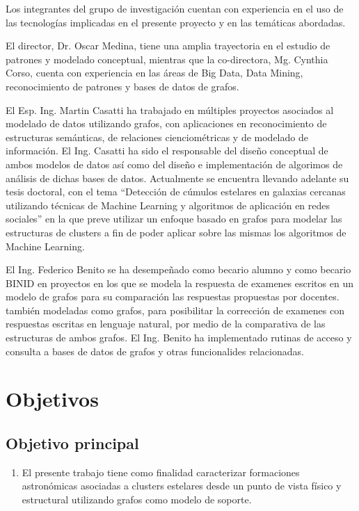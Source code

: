\documentclass[
	11pt,oneside,a4paper,
	fleqn,
	article
]{memoir}
\begin{document}
Los integrantes del grupo de investigación cuentan con experiencia en el uso de las tecnologías implicadas en el presente proyecto y en las temáticas abordadas.

El director, Dr. Oscar Medina, tiene una amplia trayectoria en el estudio de patrones y modelado conceptual, mientras que la co-directora, Mg. Cynthia Corso, cuenta con experiencia en las áreas de Big Data, Data Mining, reconocimiento de patrones y bases de datos de grafos.

El Esp. Ing. Martin Casatti ha trabajado en múltiples proyectos asociados al modelado de datos utilizando grafos, con aplicaciones en reconocimiento de estructuras semánticas, de relaciones cienciométricas y de modelado de información. El Ing. Casatti ha sido el responsable del diseño conceptual de ambos modelos de datos así como del diseño e implementación de algorimos de análisis de dichas bases de datos. Actualmente se encuentra llevando adelante su tesis doctoral, con el tema ``Detección de cúmulos estelares en galaxias cercanas utilizando técnicas de Machine Learning y algoritmos de aplicación en redes sociales'' en la que preve utilizar un enfoque basado en grafos para modelar las estructuras de clusters a fin de poder aplicar sobre las mismas los algoritmos de Machine Learning.

El Ing. Federico Benito se ha desempeñado como becario alumno y como becario BINID en proyectos en los que se modela la respuesta de examenes escritos en un modelo de grafos para su comparación las respuestas propuestas por docentes. también modeladas como grafos, para posibilitar la corrección de examenes con respuestas escritas en lenguaje natural, por medio de la comparativa de las estructuras de ambos grafos. El Ing. Benito ha implementado rutinas de acceso y consulta a bases de datos de grafos y otras funcionalides relacionadas.

\section {Objetivos}

\subsection{Objetivo principal} 

\begin{enumerate}
	\item \label{objetivo:general} El presente trabajo tiene como finalidad caracterizar formaciones astronómicas asociadas a clusters estelares desde un punto de vista físico y estructural utilizando grafos como modelo de soporte.	
\end{enumerate}
\end{document}

